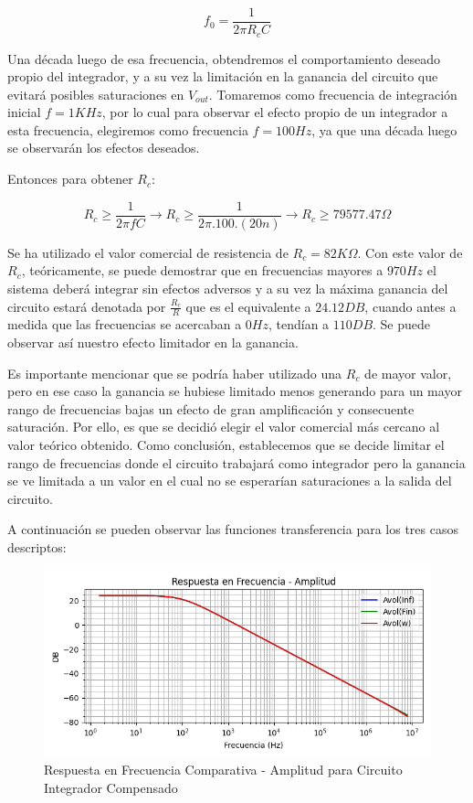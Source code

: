 $$f_0 = \frac{1}{2\pi R_cC}$$

Una década luego de esa frecuencia, obtendremos el comportamiento deseado propio del integrador, y a su vez la limitación en la ganancia del circuito que evitará posibles saturaciones en $V_{out}$.
Tomaremos como frecuencia de integración inicial $f=1KHz$, por lo cual para observar el efecto propio de un integrador a esta frecuencia, elegiremos como frecuencia
$f=100Hz$, ya que una década luego se observarán los efectos deseados. 

Entonces para obtener $R_c$:

$$R_c \geq \frac {1}{2\pi fC} \longrightarrow R_c \geq \frac {1}{2\pi .100.(20n)}\longrightarrow R_c \geq 79577.47 \Omega $$

Se ha utilizado el valor comercial de resistencia de $R_c=82K\Omega$. Con este valor de $R_c$, teóricamente, se puede demostrar que en frecuencias mayores
a $970 Hz$ el sistema deberá integrar sin efectos adversos y a su vez la máxima ganancia del circuito estará denotada por $\frac {R_c}{R}$ que es el equivalente a
$24.12DB$, cuando antes a medida que las frecuencias se acercaban a $0Hz$, tendían a $110DB$. Se puede observar así nuestro efecto limitador en la ganancia.

Es importante mencionar que se podría haber utilizado una $R_c$ de mayor valor, pero en ese caso la ganancia se hubiese limitado menos generando para un mayor rango de frecuencias bajas
un efecto de gran amplificación y consecuente saturación. Por ello, es que se decidió elegir el valor comercial más cercano al valor teórico obtenido.
Como conclusión, establecemos que se decide limitar el rango de frecuencias donde el circuito trabajará como integrador pero la ganancia se ve limitada a un valor
en el cual no se esperarían saturaciones a la salida del circuito.

A continuación se pueden observar las funciones transferencia para los tres casos descriptos:

\begin{figure}[H]
    \centering 
    \includegraphics [scale=0.6] {../Ejercicio3-CircuitoIntegradoresyDerivadores/Imagenes/diagrama-bode-integrador-compensado-amplitud.png} 
    \caption{Respuesta en Frecuencia Comparativa - Amplitud para Circuito Integrador Compensado}
    \label{fig:emptyPlotTool}
\end{figure}

